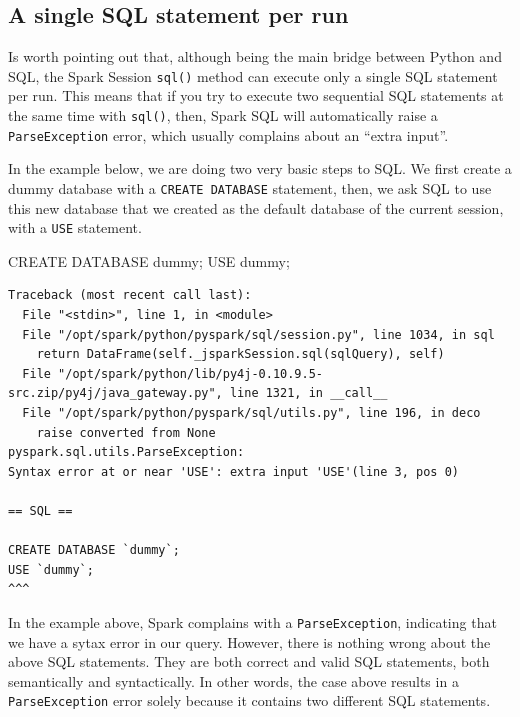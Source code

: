\documentclass[
  11pt,
  letterpaper,
  DIV=11,
  numbers=noendperiod]{scrreprt}
\newenvironment{Shaded}{\begin{snugshade}}{\end{snugshade}}
\newcommand{\KeywordTok}[1]{\textcolor[rgb]{0.00,0.23,0.31}{#1}}
\newcommand{\NormalTok}[1]{\textcolor[rgb]{0.00,0.23,0.31}{#1}}
\begin{document}
\hypertarget{a-single-sql-statement-per-run}{%
\subsection{A single SQL statement per
run}\label{a-single-sql-statement-per-run}}

Is worth pointing out that, although being the main bridge between
Python and SQL, the Spark Session \texttt{sql()} method can execute only
a single SQL statement per run. This means that if you try to execute
two sequential SQL statements at the same time with \texttt{sql()},
then, Spark SQL will automatically raise a \texttt{ParseException}
error, which usually complains about an ``extra input''.

In the example below, we are doing two very basic steps to SQL. We first
create a dummy database with a \texttt{CREATE\ DATABASE} statement,
then, we ask SQL to use this new database that we created as the default
database of the current session, with a \texttt{USE} statement.

\begin{Shaded}
\begin{Highlighting}[]
\KeywordTok{CREATE} \KeywordTok{DATABASE}\NormalTok{ \textasciigrave{}dummy\textasciigrave{};}
\KeywordTok{USE}\NormalTok{ \textasciigrave{}dummy\textasciigrave{};}
\end{Highlighting}
\end{Shaded}

\begin{verbatim}
Traceback (most recent call last):
  File "<stdin>", line 1, in <module>
  File "/opt/spark/python/pyspark/sql/session.py", line 1034, in sql
    return DataFrame(self._jsparkSession.sql(sqlQuery), self)
  File "/opt/spark/python/lib/py4j-0.10.9.5-src.zip/py4j/java_gateway.py", line 1321, in __call__
  File "/opt/spark/python/pyspark/sql/utils.py", line 196, in deco
    raise converted from None
pyspark.sql.utils.ParseException: 
Syntax error at or near 'USE': extra input 'USE'(line 3, pos 0)

== SQL ==

CREATE DATABASE `dummy`;
USE `dummy`;
^^^
\end{verbatim}

In the example above, Spark complains with a \texttt{ParseException},
indicating that we have a sytax error in our query. However, there is
nothing wrong about the above SQL statements. They are both correct and
valid SQL statements, both semantically and syntactically. In other
words, the case above results in a \texttt{ParseException} error solely
because it contains two different SQL statements.
\end{document}
